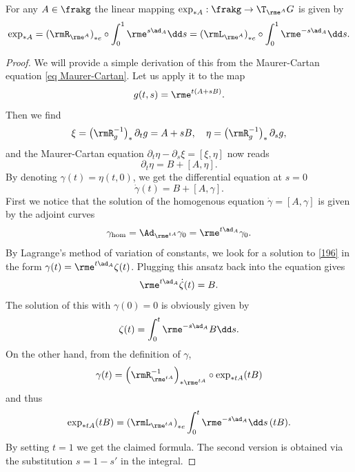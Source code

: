 \begin{thm}[{{\cite[Thm.~1.5.3]{DK}}}]\label{thm differential of exp}
    For any $A\in\frakg$ the linear mapping $\exp_{\ast A}:\frakg\to \T_{\rme^A} G$ is given by
    \[  \exp_{\ast A}=\left(\rmR_{\rme^A}\right)_{\ast e}\circ \int_0^1 \rme^{s\ad_A}\dd s=\left(\rmL_{\rme^A}\right)_{\ast e}\circ \int_0^1 \rme^{-s\ad_A}\dd s.   \label{eq 1.5.1 DK}\]
\end{thm}
\begin{proof}
    We will provide a simple derivation of this from the Maurer-Cartan equation \eqref{eq Maurer-Cartan}. Let us apply it to the map
    \[g(t,s)=\rme^{t(A+sB)}.\]
    Then we find
    \[\xi=\left(\rmR_g^{-1}\right)_\ast \partial_t g=A+sB, \quad \eta=\left(\rmR_g^{-1}\right)_\ast \partial_s g,\]
    and the Maurer-Cartan equation $\partial_t\eta-\partial_s\xi=[\xi,\eta]$ now reads
    \[\partial_t \eta=B+[A,\eta].\]
    By denoting $\gamma(t)=\eta(t,0)$, we get the differential equation at $s=0$
    \[\dot\gamma(t)=B+[A,\gamma].\label{196}\]
    First we notice that the solution of the homogenous equation $\dot\gamma=[A,\gamma]$ is given by the adjoint curves
    \[\gamma_{\mathrm{hom}}=\Ad_{\rme^{tA}}\gamma_0=\rme^{t\ad_A}\gamma_0.\]
    By Lagrange's method of variation of constants, we look for a solution to \eqref{196} in the form $\gamma(t)=\rme^{t\ad_A}\zeta(t)$. Plugging this ansatz back into the equation gives
    \[\rme^{t\ad_A}\dot\zeta(t)=B.\]
    The solution of this with $\gamma(0)=0$ is obviously given by
    \[\zeta(t)=\int_0^t \rme^{-s\ad_A}B\dd s.\]
    On the other hand, from the definition of $\gamma$,
    \[\gamma(t)=\left(\rmR_{\rme^{tA}}^{-1}\right)_{\ast \rme^{tA}}\circ \exp_{\ast tA}(tB)\]
    and thus
    \[\exp_{\ast tA}(tB)=\left(\rmL_{\rme^{tA}}\right)_{\ast e}\int_0^t\rme^{-s\ad_A}\dd s\,(tB).\]
    By setting $t=1$ we get the claimed formula. The second version is obtained via the substitution $s=1-s'$ in the integral.
\end{proof}


